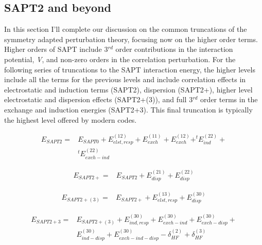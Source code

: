 \begin{theory}
  \subsection{\label{ch2:sec2:level3}SAPT2 and beyond}
  In this section I'll complete our discussion on the common truncations of the symmetry adapted perturbation
  theory, focusing now on the higher order terms. Higher orders of SAPT include 3$^{rd}$ order contributions
  in the interaction potential, \emph{V}, and non-zero orders in the correlation perturbation. For the following
  series of truncations to the SAPT interaction energy, the higher levels include all the terms for the previous
  levels and include correlation effects in electrostatic and induction terms (SAPT2), dispersion (SAPT2+),
  higher level electrostatic and dispersion effects (SAPT2+(3)), and full 3$^{rd}$ order terms in the exchange 
  and induction energies (SAPT2+3). This final truncation is typically the highest level offered by modern
  codes.
  
  \begin{equation}\label{sapt2}
   \begin{split}
      E_{SAPT2} = &E_{SAPT0} + E_{elst,resp}^{(12)} + E_{exch}^{(11)} + E_{exch}^{(12)} + ^{t}E_{ind}^{(22)} + \\
                  &^{t}E_{exch-ind}^{(22)}
   \end{split}
  \end{equation}
  
  \begin{equation}\label{sapt2p}
   \begin{split}
      E_{SAPT2+} = &E_{SAPT2} + E_{disp}^{(21)} + E_{disp}^{(22)}
   \end{split}
  \end{equation}
  
  \begin{equation}\label{sapt2p_3}
   \begin{split}
      E_{SAPT2+(3)} = &E_{SAPT2+} + E_{elst,resp}^{(13)} + E_{disp}^{(30)}
   \end{split}
  \end{equation}
  
  \begin{equation}\label{sapt2p3}
   \begin{split}
      E_{SAPT2+3} = &E_{SAPT2+(3)} + E_{ind,resp}^{(30)} + E_{exch-ind}^{(30)} + E_{exch-disp}^{(30)} + \\
                    &E_{ind-disp}^{(30)} + E_{exch-ind-disp}^{(30)} - \delta_{HF}^{(2)} + \delta_{HF}^{(3)}
   \end{split}
  \end{equation}  
  

\end{theory}
